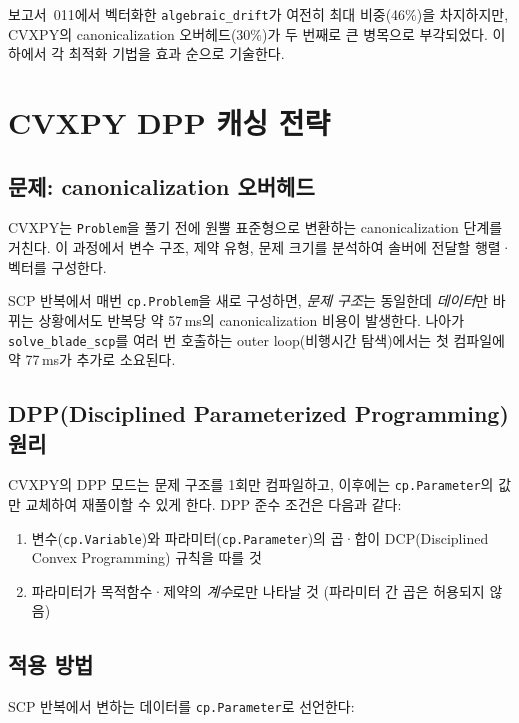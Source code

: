\documentclass[11pt]{article}
\begin{document}
보고서~011\cite{report011}에서 벡터화한 \texttt{algebraic\_drift}가
여전히 최대 비중(46\%)을 차지하지만,
CVXPY의 canonicalization 오버헤드(30\%)가 두 번째로 큰 병목으로 부각되었다.
이하에서 각 최적화 기법을 효과 순으로 기술한다.


\section{CVXPY DPP 캐싱 전략}
\label{sec:dpp}

\subsection{문제: canonicalization 오버헤드}

CVXPY는 \texttt{Problem}을 풀기 전에 원뿔 표준형으로 변환하는
canonicalization 단계를 거친다.
이 과정에서 변수 구조, 제약 유형, 문제 크기를 분석하여 솔버에 전달할
행렬·벡터를 구성한다.

SCP 반복에서 매번 \texttt{cp.Problem}을 새로 구성하면,
\emph{문제 구조}는 동일한데 \emph{데이터}만 바뀌는 상황에서도
반복당 약 57\,ms의 canonicalization 비용이 발생한다.
나아가 \texttt{solve\_blade\_scp}를 여러 번 호출하는
outer loop(비행시간 탐색)에서는 첫 컴파일에 약 77\,ms가 추가로 소요된다.

\subsection{DPP(Disciplined Parameterized Programming) 원리}

CVXPY의 DPP 모드는 문제 구조를 1회만 컴파일하고,
이후에는 \texttt{cp.Parameter}의 값만 교체하여 재풀이할 수 있게 한다.
DPP 준수 조건은 다음과 같다:
\begin{enumerate}
  \item 변수(\texttt{cp.Variable})와 파라미터(\texttt{cp.Parameter})의
        곱·합이 DCP(Disciplined Convex Programming) 규칙을 따를 것
  \item 파라미터가 목적함수·제약의 \emph{계수}로만 나타날 것
        (파라미터 간 곱은 허용되지 않음)
\end{enumerate}

\subsection{적용 방법}

SCP 반복에서 변하는 데이터를 \texttt{cp.Parameter}로 선언한다:
\end{document}
